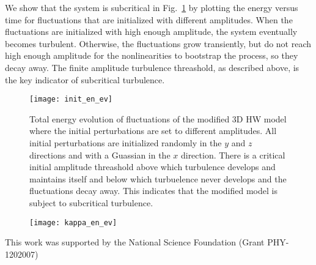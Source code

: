 \documentclass[letter,scriptaddress,twocolumn, prl,showkeys]{revtex4}
\begin{document}
We show that the system is subcritical in Fig.~\ref{init_en_ev} by plotting the energy versus time for fluctuations that are initialized with different amplitudes. When the fluctuations are initialized
with high enough amplitude, the system eventually becomes turbulent. Otherwise, the fluctuations grow transiently, but do not reach high enough amplitude for the nonlinearities to bootstrap the process,
so they decay away. The finite amplitude turbulence threashold, as described above, is the key indicator of subcritical turbulence.

\begin{figure}
\centerline{\texttt{[image: init\_en\_ev]}}
\caption{Total energy evolution of fluctuations of the modified 3D HW model where the initial perturbations are set to different amplitudes. All initial perturbations are initialized randomly in
the $y$ and $z$ directions and with a Guassian in the $x$ direction. There is a critical initial amplitude threashold above which turbulence develops and maintains itself
and below which turbuelence never develops and the fluctuations decay away. This indicates that the modified model is subject to subcritical turbulence.}
\label{init_en_ev}
\end{figure}

\begin{figure}
\centerline{\texttt{[image: kappa\_en\_ev]}}
\caption{}
\label{kappa_en_ev}
\end{figure}


\begin{acknowledgments}
This work was supported by the National Science Foundation (Grant PHY-1202007)
\end{acknowledgments}


%

\end{document}
